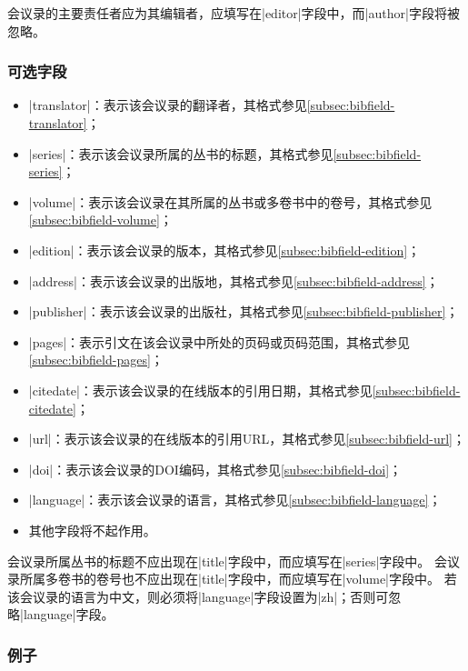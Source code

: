\begin{note}
会议录的主要责任者应为其编辑者，应填写在|editor|字段中，而|author|字段将被忽略。
\end{note}

\subsubsection{可选字段}

\begin{itemize}
\item |translator|：表示该会议录的翻译者，其格式参见\ref{subsec:bibfield-translator}；
\item |series|：表示该会议录所属的丛书的标题，其格式参见\ref{subsec:bibfield-series}；
\item |volume|：表示该会议录在其所属的丛书或多卷书中的卷号，其格式参见\ref{subsec:bibfield-volume}；
\item |edition|：表示该会议录的版本，其格式参见\ref{subsec:bibfield-edition}；
\item |address|：表示该会议录的出版地，其格式参见\ref{subsec:bibfield-address}；
\item |publisher|：表示该会议录的出版社，其格式参见\ref{subsec:bibfield-publisher}；
\item |pages|：表示引文在该会议录中所处的页码或页码范围，其格式参见\ref{subsec:bibfield-pages}；
\item |citedate|：表示该会议录的在线版本的引用日期，其格式参见\ref{subsec:bibfield-citedate}；
\item |url|：表示该会议录的在线版本的引用URL，其格式参见\ref{subsec:bibfield-url}；
\item |doi|：表示该会议录的DOI编码，其格式参见\ref{subsec:bibfield-doi}；
\item |language|：表示该会议录的语言，其格式参见\ref{subsec:bibfield-language}；
\item 其他字段将不起作用。
\end{itemize}

\begin{note}
会议录所属丛书的标题不应出现在|title|字段中，而应填写在|series|字段中。
会议录所属多卷书的卷号也不应出现在|title|字段中，而应填写在|volume|字段中。
若该会议录的语言为中文，则必须将|language|字段设置为|zh|；否则可忽略|language|字段。
\end{note}

\subsubsection{例子}

